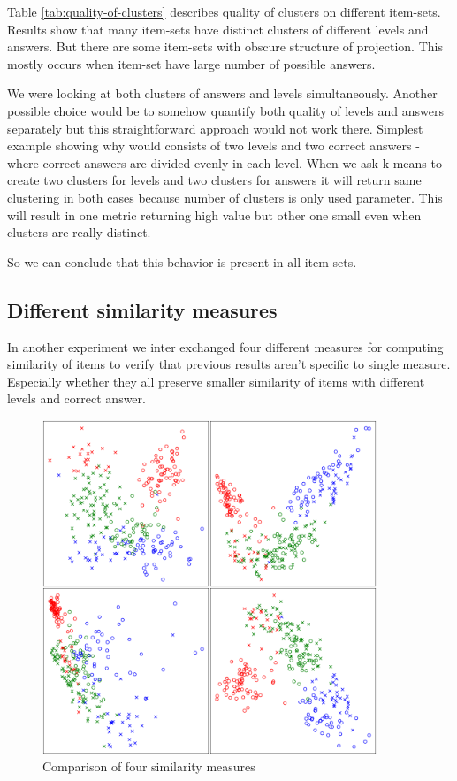 \documentclass[
  digital, %
  table,   %
  nolof,     %
  nolot,     %
  nocover
]{fithesis3}
\begin{document}
Table \ref{tab:quality-of-clusters} describes quality of clusters on different item-sets. Results show that many item-sets have distinct clusters of different levels and answers. But there are some item-sets with obscure structure of projection. This mostly occurs when item-set have large number of possible answers.


We were looking at both clusters of answers and levels simultaneously. Another possible choice would be to somehow quantify both quality of levels and answers separately but this straightforward approach would not work there. Simplest example showing why would consists of two levels and two correct answers - where correct answers are divided evenly in each level. When we ask k-means to create two clusters for levels and two clusters for answers it will return same clustering in both cases because number of clusters is only used parameter. This will result in one metric returning high value but other one small even when clusters are really distinct.


So we can conclude that this behavior is present in all item-sets.


\subsection{Different similarity measures}

In another experiment we inter exchanged four different measures for computing similarity of items to verify that previous results aren't specific to single measure. Especially whether they all preserve smaller similarity of items with different levels and correct answer.

\begin{figure}
  \includegraphics[width=10cm]{img/measures}
  \caption{Comparison of four similarity measures}
  \label{fig:measures}
\end{figure}
\end{document}
